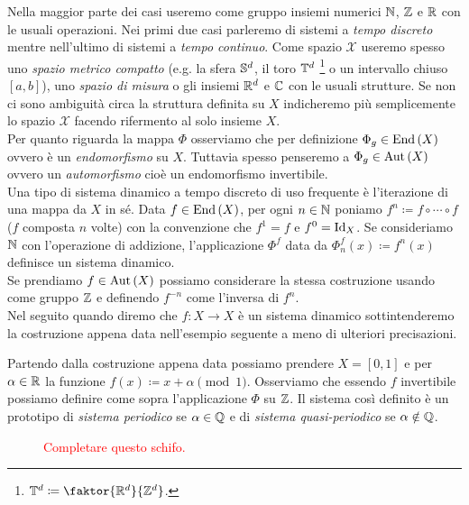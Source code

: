 Nella maggior parte dei casi useremo come gruppo insiemi numerici $ \N $, $ \Z $ e $ \R $ con le usuali operazioni. Nei primi due casi parleremo di sistemi a \emph{tempo discreto} mentre nell'ultimo di sistemi a \emph{tempo continuo}. Come spazio $ \mathcal{X} $ useremo spesso uno \emph{spazio metrico compatto} (e.g. la sfera $ \S^d $, il toro $ \T^d $ \footnote{$ \T^d \coloneqq \faktor{\R^d}{\Z^d} $.} o un intervallo chiuso $ [a, b] $), uno \emph{spazio di misura} o gli insiemi $ \R^d $ e $ \C $ con le usuali strutture. Se non ci sono ambiguità circa la struttura definita su $ X $ indicheremo più semplicemente lo spazio $ \mathcal{X} $ facendo rifermento al solo insieme $ X $. \\

Per quanto riguarda la mappa $ \Phi $ osserviamo che per definizione $ \Phi_g \in \End{(X)} $ ovvero è un \emph{endomorfismo} su $ X $. Tuttavia spesso penseremo a $ \Phi_g \in \Aut{(X)} $ ovvero un \emph{automorfismo} cioè un endomorfismo invertibile. \\

Una tipo di sistema dinamico a tempo discreto di uso frequente è l'iterazione di una mappa da $ X $ in sé. Data $ f \in \End{(X)} $, per ogni $ n \in \N $ poniamo $ f^n \coloneqq f \circ \cdots \circ f $ ($ f $ composta $ n $ volte) con la convenzione che $ f^1 = f $ e $ f^0 = \Id_X $. Se consideriamo $ \N $ con l'operazione di addizione, l'applicazione $ \Phi^f $ data da $ \Phi_n^f(x) \coloneqq f^n(x) $ definisce un sistema dinamico. \\
Se prendiamo $ f \in \Aut{(X)} $ possiamo considerare la stessa costruzione usando come gruppo $ \Z $ e definendo $ f^{-n} $ come l'inversa di $ f^n $. \\
Nel seguito quando diremo che $ f \colon X \to X $ è un sistema dinamico sottintenderemo la costruzione appena data nell'esempio seguente a meno di ulteriori precisazioni. 


\begin{example}
	Partendo dalla costruzione appena data possiamo prendere $ X = [0, 1] $ e per $ \alpha \in \R $ la funzione $ f(x) \coloneqq x + \alpha \pmod{1} $. Osserviamo che essendo $ f $ invertibile possiamo definire come sopra l'applicazione $ \Phi $ su $ \Z $. Il sistema così definito è un prototipo di \emph{sistema periodico} se $ \alpha \in \Q $ e di \emph{sistema quasi-periodico} se $ \alpha \notin \Q $. 
	\iffigureon
	\begin{figure}[h!]
		\centering
		
		\caption{\textcolor{red}{Completare questo schifo.}}
	\end{figure}
	\fi
\end{example}

